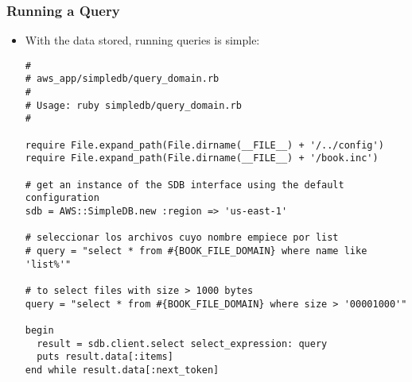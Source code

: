 \documentclass{beamer}
\begin{document}
\begin{frame}
\frametitle{Running a Query}
\begin{itemize}
\item With the data stored, running queries is simple:

\lstset{language=Ruby, style=eclipse}
\begin{lstlisting}
#
# aws_app/simpledb/query_domain.rb
#
# Usage: ruby simpledb/query_domain.rb
#

require File.expand_path(File.dirname(__FILE__) + '/../config')
require File.expand_path(File.dirname(__FILE__) + '/book.inc')

# get an instance of the SDB interface using the default configuration
sdb = AWS::SimpleDB.new :region => 'us-east-1'

# seleccionar los archivos cuyo nombre empiece por list
# query = "select * from #{BOOK_FILE_DOMAIN} where name like 'list%'"

# to select files with size > 1000 bytes
query = "select * from #{BOOK_FILE_DOMAIN} where size > '00001000'"

begin
  result = sdb.client.select select_expression: query
  puts result.data[:items]
end while result.data[:next_token]
\end{lstlisting}
\end{itemize}
\end{frame}
\end{document}
